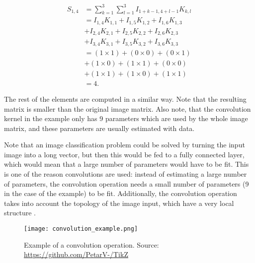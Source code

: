 \begin{equation}
  \begin{split}
      S_{1,4} & =
      \sum_{k=1}^3 \sum_{l=1}^3 I_{1+k-1,4+l-1} K_{k, l} \\
      & = I_{1,4}K_{1,1} + I_{1,5}K_{1,2} + I_{1,6}K_{1,3} \\
      & + I_{2,4}K_{2,1} + I_{2,5}K_{2,2} + I_{2,6}K_{2,3} \\
      & + I_{3,4}K_{3,1} + I_{3,5}K_{3,2} + I_{3,6}K_{3,3} \\
      & = ( 1 \times 1 ) + ( 0 \times 0 ) + ( 0 \times 1 ) \\
      & + ( 1 \times 0 ) + ( 1 \times 1 ) + ( 0 \times 0 ) \\
      & + ( 1 \times 1 ) + ( 1 \times 0 ) + ( 1 \times 1 ) \\
      & = 4.
  \end{split}
\end{equation}

The rest of the elements are computed in a similar way. Note that the resulting matrix is smaller than the original image matrix. Also note, that the convolution kernel in the example only has 9 parameters which are used by the whole image matrix, and these parameters are usually estimated with data.

Note that an image classification problem could be solved by turning the input image into a long vector, but then this would be fed to a fully connected layer, which would mean that a large number of parameters would have to be fit. This is one of the reason convolutions are used: instead of estimating a large number of parameters, the convolution operation needs a small number of parameters (9 in the case of the example) to be fit. Additionally, the convolution operation takes into account the topology of the image input, which have a very local structure \cite{lecun1998gradient}.


\begin{figure}[H]
    \centering
    \texttt{[image: convolution\_example.png]}
    \caption{Example of a convolution operation. Source: \url{https://github.com/PetarV-/TikZ}}
    \label{fig:conv_example}
\end{figure}

